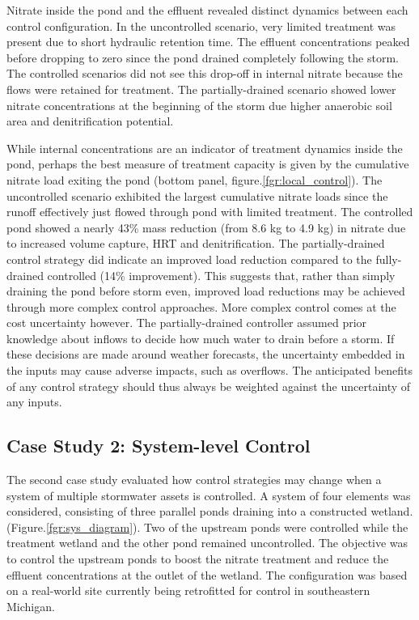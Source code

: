 Nitrate inside the pond and the effluent revealed distinct dynamics between each
control configuration. In the uncontrolled scenario, very limited treatment was
present due to short hydraulic retention time. The effluent concentrations
peaked before dropping to zero since the pond drained completely following the
storm. The controlled scenarios did not see this drop-off in internal nitrate
because the flows were retained for treatment. The partially-drained scenario
showed lower nitrate concentrations at the beginning of the storm due higher
anaerobic
soil area and denitrification potential.

While internal concentrations are an indicator of treatment dynamics inside the pond, perhaps the best measure of treatment capacity is given by the cumulative nitrate load exiting the pond (bottom panel, figure.\ref{fgr:local_control}). The uncontrolled scenario exhibited the largest cumulative nitrate loads since the runoff effectively just flowed through pond with limited treatment. The controlled pond showed a nearly 43\% mass reduction (from 8.6 kg to 4.9 kg) in nitrate due to increased volume capture, HRT and denitrification. The partially-drained control strategy did indicate an improved load reduction compared to the fully-drained controlled (14\% improvement). This suggests that, rather than simply draining the pond before storm even, improved load reductions may be achieved through more complex control approaches. More complex control comes at the cost uncertainty however. The partially-drained controller assumed prior knowledge about inflows to decide how much water to drain before a storm. If these decisions are made around weather forecasts, the uncertainty embedded in the inputs may cause adverse impacts, such as overflows. The anticipated benefits of any control strategy should thus always be weighted against the uncertainty of any inputs. 



\subsection{Case Study 2: System-level Control}

The second case study evaluated how control strategies may change when a system of multiple stormwater assets is controlled. 
A system of four elements was considered, consisting of three parallel ponds draining into a constructed wetland.  (Figure.\ref{fgr:sys_diagram}). 
Two of the upstream ponds were controlled while the treatment wetland and the other pond remained uncontrolled. 
The objective was to control the upstream ponds to boost the nitrate treatment and reduce the effluent concentrations at the outlet of the wetland. 
The configuration was based on a real-world site currently being retrofitted for control in southeastern Michigan. 

